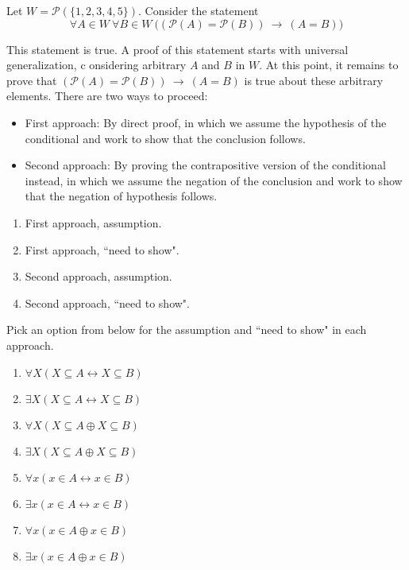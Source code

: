 
Let $W =  \mathcal{P}(\{1,2,3,4,5\})$.
Consider the  statement
$$\forall A \in W~ \forall B\in W~  \big( ( \mathcal{P}(A) = \mathcal{P}(B) )~\to~ (A = B) \big) $$

This statement is true. A proof of this statement starts with universal generalization, c
onsidering
arbitrary $A$ and $B$ in $W$. At this point, it remains to prove that 
$( \mathcal{P}(A) = \mathcal{P}(B) )~\to~ (A = B)$
is true about these arbitrary elements.  There are two ways to proceed: 

\begin{itemize}
\item[] First approach: By direct proof, in which we assume the hypothesis of the 
conditional and work to show that the conclusion follows.
\item[] Second approach: By proving the contrapositive version of the conditional instead, in which we
assume the negation of the conclusion and work to show that the negation of hypothesis follows.
\end{itemize} 

\begin{enumerate}
    \item First approach, assumption.
    \item First approach, ``need to show".
    \item Second approach, assumption.
    \item Second approach, ``need to show".
\end{enumerate}

Pick an option from below for the assumption and ``need to show" in each approach.


\begin{multicols}{2}
\begin{enumerate}[label=(\roman*)]
\item $\forall X ( X \subseteq A \leftrightarrow X \subseteq B)$
\item $\exists X ( X \subseteq A \leftrightarrow X \subseteq B)$
\item $\forall X ( X \subseteq A \oplus X \subseteq B)$
\item $\exists X ( X \subseteq A \oplus X \subseteq B)$
\item $\forall x ( x \in A \leftrightarrow x \in B)$
\item $\exists x ( x \in A \leftrightarrow x \in B)$
\item $\forall x ( x \in A \oplus x \in B)$
\item $\exists x ( x \in A \oplus x \in B)$
\end{enumerate}
\end{multicols}